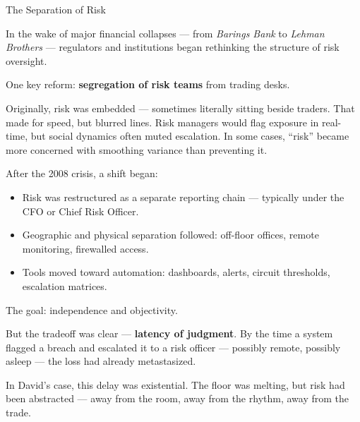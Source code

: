 \medskip

\begin{HistoricalSidebar}{The Separation of Risk}

  In the wake of major financial collapses — from \textit{Barings Bank} to \textit{Lehman Brothers} — regulators and 
  institutions began rethinking the structure of risk oversight.
  
  \medskip
  
  One key reform: \textbf{segregation of risk teams} from trading desks.
  
  \medskip
  
  Originally, risk was embedded — sometimes literally sitting beside traders. That made for speed, but blurred lines. 
  Risk managers would flag exposure in real-time, but social dynamics often muted escalation. In some cases, “risk” 
  became more concerned with smoothing variance than preventing it.
  
  \medskip
  
  After the 2008 crisis, a shift began:

  \medskip

  \begin{itemize}
    \item Risk was restructured as a separate reporting chain — typically under the CFO or Chief Risk Officer.
    \item Geographic and physical separation followed: off-floor offices, remote monitoring, firewalled access.
    \item Tools moved toward automation: dashboards, alerts, circuit thresholds, escalation matrices.
  \end{itemize}
  
  \medskip
  
  The goal: independence and objectivity.

  \medskip
  
  But the tradeoff was clear — \textbf{latency of judgment}. By the time a system flagged a breach and escalated it 
  to a risk officer — possibly remote, possibly asleep — the loss had already metastasized.
  
  \medskip
  
  In David’s case, this delay was existential. The floor was melting, but risk had been abstracted — away from the 
  room, away from the rhythm, away from the trade.
  
\end{HistoricalSidebar}

\medskip

